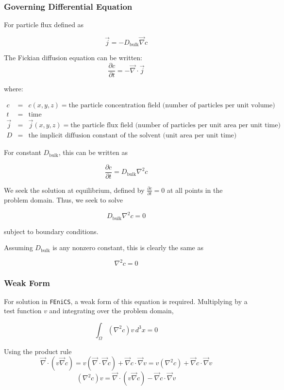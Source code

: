 \documentclass{article}
\begin{document}
\subsubsection{Governing Differential Equation}
For particle flux defined as 

$$\vec{j} = - D_{\text{bulk}} \vec{\nabla} c$$

The Fickian diffusion equation can be written:
$$\frac{\partial c}{\partial t} = - \vec{\nabla} \cdot \vec{j}$$

where:

$\begin{array}{rcl}
c & = & c(x,y,z) = \text{the particle concentration field (number of particles per unit volume)} \\
t & = & \text{time} \\
\vec{j} & = & \vec{j}(x,y,z) = \text{the particle flux field (number of particles per unit area per unit time)} \\
D & = & \text{the implicit diffusion constant of the solvent (unit area per unit time)}
\end{array}$

For constant $D_{\text{bulk}}$, this can be written as

$$\frac{\partial c}{\partial t} = D_{\text{bulk}} \nabla^2 c$$

We seek the solution at equilibrium, defined by
$\frac{\partial c}{\partial t} = 0$ at all points in the problem domain.
Thus, we seek to solve

$$D_{\text{bulk}} \nabla^2 c = 0$$

subject to boundary conditions.

Assuming $D_{\text{bulk}}$ is any nonzero constant, this is clearly the same as

$$ \nabla^2 c = 0$$

\subsubsection{Weak Form}

For solution in \texttt{FEniCS}, a weak form of this equation is required.
Multiplying by a test function $v$ and integrating over the problem domain,

$$\int_{\Omega} \left(\nabla^2 c \right) v \,d^3x = 0$$

Using the product rule
$$\vec{\nabla} \cdot \left( v \vec{\nabla} c \right) =
v \left(\vec{\nabla} \cdot \vec{\nabla} c \right) + \vec{\nabla}c \cdot \vec{\nabla}v =
v \left(\nabla^2 c \right) + \vec{\nabla}c \cdot \vec{\nabla}v$$
$$\left(\nabla^2 c \right) v =
\vec{\nabla} \cdot \left( v \vec{\nabla} c \right) - \vec{\nabla}c \cdot \vec{\nabla}v$$
\end{document}
